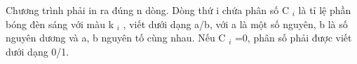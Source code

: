 Chương trình phải in ra đúng n dòng. Dòng thứ i chứa phân số C   $_    i   $   là tỉ lệ phần bóng đèn sáng với màu k   $_    i   $   , viết dưới dạng a/b, với a là một số nguyên, b là số nguyên dương và a, b nguyên tố cùng nhau. Nếu C   $_    i   $   =0, phân số phải được viết dưới dạng 0/1.